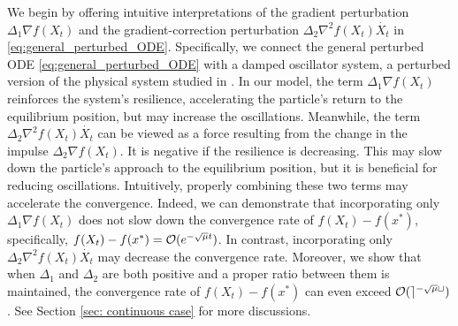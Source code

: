\documentclass[11pt]{article}
\newcommand{\1}{\mathbf 1}
\numberwithin{equation}{section}
\begin{document}
We begin by offering intuitive interpretations of the gradient perturbation \( \Delta_1 \nabla f(X_t) \) and the gradient-correction perturbation \( \Delta_2 \nabla^2 f(X_t) \dot{X_t} \) in \eqref{eq:general_perturbed_ODE}.
Specifically, we connect the general perturbed ODE \eqref{eq:general_perturbed_ODE} with a damped oscillator system, a perturbed version of the physical system studied in \cite{Yang_2018_physical}. 
In our model, the term $\Delta_1\nabla f(X_t)$ reinforces the system's resilience, accelerating the particle's return to the equilibrium position, but may increase the oscillations. Meanwhile, the term $\Delta_2\nabla^2 f(X_t)\dot{X_t}$ can be viewed as a force resulting from the change in the impulse $\Delta_2\nabla f(X_t)$. It is negative if the resilience is decreasing. This may slow down the particle's approach to the equilibrium position, but it is beneficial for reducing oscillations. Intuitively, properly combining these two terms may accelerate the convergence. Indeed, we can demonstrate that incorporating only $\Delta_1\nabla f(X_t)$ does not slow down the convergence rate of $f(X_t)-f(x^*)$, specifically, $f(X_t)-f(x^*)={\cal O}(e^{-\sqrt{\mu}t})$.  {In contrast, incorporating only $\Delta_2\nabla ^2 f(X_t)\dot{X_t}$ may decrease the convergence rate.} Moreover, we show that when $\Delta_1$ and $\Delta_2$ are both positive and a proper ratio between them is maintained, the convergence rate of $f(X_t)-f(x^*)$ can even exceed $\cal{O}(e^{-\sqrt{\mu}t})$. 
See Section \ref{sec: continuous case} for more discussions. 
\end{document}
